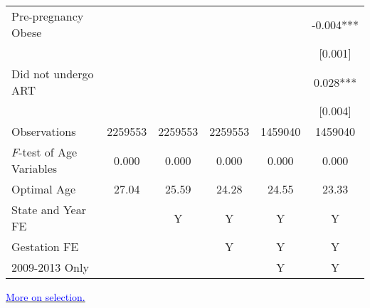 \documentclass[10pt,letterpaper,subeqn]{beamer}
\begin{document}
\begin{frame}[label=SOBcorr]
\begin{table}[htbp]
{\begin{tabular}{l*{5}{c}}
      Pre-pregnancy Obese &               &               &               &               &     -0.004***\\
      &               &               &               &               &     [0.001]   \\
      Did not undergo ART &               &               &               &               &       0.028***\\
      &               &               &               &               &     [0.004]   \\
      \midrule
      Observations        &     2259553   &     2259553   &     2259553   &     1459040   &     1459040   \\
      $F$-test of Age Variables&0.000&0.000&0.000&0.000&0.000 \\
      Optimal Age &27.04&25.59&24.28&24.55&23.33 \\
      State and Year FE&&Y&Y&Y&Y\\
      Gestation FE &&&Y&Y&Y\\
      2009-2013 Only&&&&Y&Y\\ \bottomrule
\end{tabular}}\end{table}
\hyperlink{selecYoung}{\footnotesize \textcolor{blue}{More on selection.}}
\end{frame}
\end{document}
